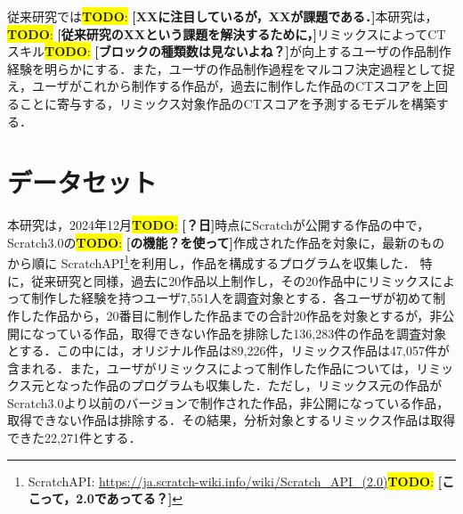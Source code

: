 \documentclass[submit,techrep,noauthor]{ipsj}
\newcommand{\todo}[1]{\colorbox{yellow}{{\bf TODO}:}{\color{red} {\textbf{[#1]}}}}
\begin{document}
従来研究では\todo{XXに注目しているが，XXが課題である．}本研究は，\todo{従来研究のXXという課題を解決するために，}リミックスによってCTスキル\todo{ブロックの種類数は見ないよね？}が向上するユーザの作品制作経験を明らかにする．また，ユーザの作品制作過程をマルコフ決定過程として捉え，ユーザがこれから制作する作品が，過去に制作した作品のCTスコアを上回ることに寄与する，リミックス対象作品のCTスコアを予測するモデルを構築する．


\section{データセット}
\label{sec:dataset}

本研究は，2024年12月\todo{？日}時点にScratchが公開する作品の中で，Scratch3.0の\todo{の機能？を使って}作成された作品を対象に，最新のものから順に
ScratchAPI\footnote{ScratchAPI: \url{https://ja.scratch-wiki.info/wiki/Scratch_API_(2.0)}\todo{ここって，2.0であってる？}}を利用し，作品を構成するプログラムを収集した．
特に，従来研究\cite{hashitani2022scratch}と同様，過去に20作品以上制作し，その20作品中にリミックスによって制作した経験を持つユーザ7,551人を調査対象とする．各ユーザが初めて制作した作品から，20番目に制作した作品までの合計20作品を対象とするが，非公開になっている作品，取得できない作品を排除した136,283件の作品を調査対象とする．この中には，オリジナル作品は89,226件，リミックス作品は47,057件が含まれる．また，ユーザがリミックスによって制作した作品については，リミックス元となった作品のプログラムも収集した．ただし，リミックス元の作品がScratch3.0より以前のバージョンで制作された作品，非公開になっている作品，取得できない作品は排除する．その結果，分析対象とするリミックス作品は取得できた22,271件とする．
\end{document}
